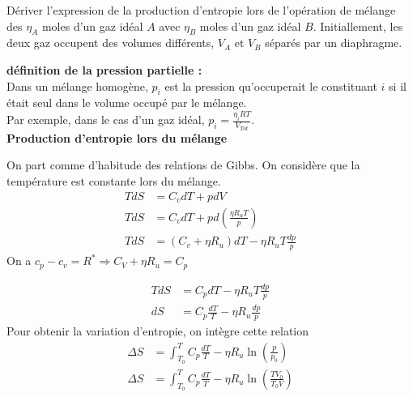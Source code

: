     Dériver l'expression de la production d'entropie lors de l'opération de mélange des $\eta_A$ moles d'un gaz idéal $A$ avec $\eta_B$
    moles d'un gaz idéal $B$. Initiallement, les deux gaz occupent des volumes différents, $V_A$ et $V_B$ séparés par un diaphragme.
\begin{tcolorbox}
    \textbf{définition de la pression partielle :}\\
    Dans un mélange homogène, $p_i$ est la pression qu'occuperait le constituant $i$ si il était seul dans le volume occupé par le mélange.\\
    Par exemple, dans le cas d'un gaz idéal, $p_i = \frac{\eta_i RT}{V_{Tot}}$.\\

    \textbf{Production d'entropie lors du mélange}

    On part comme d'habitude des relations de Gibbs. On considère que la température est constante lors du mélange.
    \begin{align*}
        TdS &= C_v dT + pdV \\
        TdS &= C_v dT + p d \left(\frac{\eta R_u T}{p}\right)\\
        TdS &= \left(C_v + \eta R_u\right)dT - \eta R_u T \frac{dp}{p}
    \end{align*}
    On a $c_p - c_v = R^* \Rightarrow C_V + \eta R_u = C_p$

    \begin{align*}
        TdS &= C_p dT - \eta R_u T \frac{dp}{p}\\
        dS &= C_p \frac{dT}{T} - \eta R_u \frac{dp}{p}
    \end{align*}
    Pour obtenir la variation d'entropie, on intègre cette relation
    \begin{align*}
        \Delta S &= \int_{T_0}^T C_p \frac{dT}{T}- \eta R_u \ln \left(\frac{p}{p_0}\right)\\
        \Delta S &= \int_{T_0}^T C_p \frac{dT}{T}- \eta R_u \ln \left(\frac{TV_0}{T_0V}\right)
    \end{align*}
\end{tcolorbox}